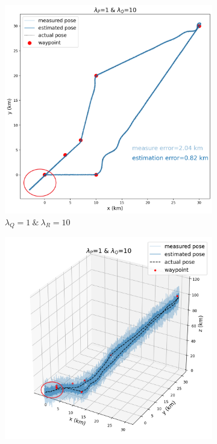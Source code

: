  
 \begin{figure}[h]
 	\centering
 	\begin{subfigure}[t]{0.24\textwidth}
 		\centering
 		\includegraphics[width=\linewidth]{figures/estimate_P1_Q10_2d.png}
 		\caption{$\lambda_Q=1\:\&\:\lambda_R=10$}
 	\end{subfigure} 
 	\hfill
 	\begin{subfigure}[t]{0.24\textwidth}
 		\centering
 		\includegraphics[width=\linewidth]{figures/estimate_P1_Q10_3d.png}

\end{subfigure}
\end{figure}
